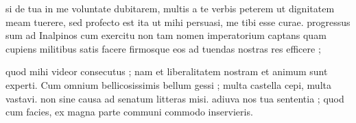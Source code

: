 


 si de tua in me voluntate dubitarem, multis a te verbis peterem ut dignitatem meam tuerere, sed profecto est ita ut mihi persuasi, me tibi esse curae. progressus sum ad Inalpinos cum exercitu non tam nomen imperatorium captans quam cupiens militibus satis facere firmosque eos ad tuendas nostras res efficere ;

 quod mihi videor consecutus ; nam et liberalitatem nostram et animum sunt experti. Cum omnium bellicosissimis bellum gessi ; multa castella cepi, multa vastavi. non sine causa ad senatum litteras misi. adiuva nos tua sententia ; quod cum facies, ex magna parte communi commodo inservieris.
